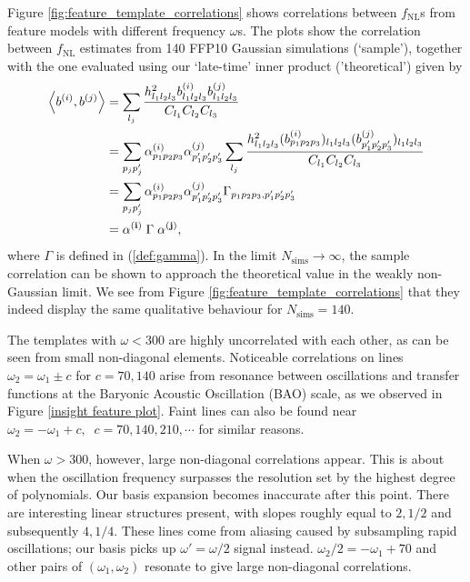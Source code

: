 Figure \ref{fig:feature_template_correlations} shows correlations between $f_\text{NL}$s from feature models with different frequency $\omega$s. The plots show the correlation between $f_\text{NL}$ estimates from 140 FFP10 Gaussian simulations (`sample'), together with the one evaluated using our `late-time' inner product ('theoretical') given by
\begin{align}
	\left< b^{(i)}, b^{(j)} \right> &= \sum_{l_j} \frac{h^2_{l_1 l_2 l_3} b^{(i)}_{l_1 l_2 l_3} b^{(j)}_{l_1 l_2 l_3}}{C_{l_1} C_{l_2} C_{l_3}}  \\
	&= \sum_{p_j p'_j} \alpha^{(i)}_{p_1 p_2 p_3} \alpha^{(j)}_{p'_1 p'_2 p'_3} \sum_{l_j} \frac{h^2_{l_1 l_2 l_3} (b^{(i)}_{p_1 p_2 p_3})_{l_1 l_2 l_3} (b^{(j)}_{p'_1 p'_2 p'_3})_{l_1 l_2 l_3}}{C_{l_1} C_{l_2} C_{l_3}} \\
	&= \sum_{p_j p'_j} \alpha^{(i)}_{p_1 p_2 p_3} \alpha^{(j)}_{p'_1 p'_2 p'_3} \Gamma_{p_1 p_2 p_3, p'_1 p'_2 p'_3} \\
	&= \mathbf{\alpha^{(i)}} \; \Gamma \; \mathbf{\alpha^{(j)}}, \label{eqn:late_time_inner_product}
\end{align}
where $\Gamma$ is defined in (\ref{def:gamma}). In the limit $N_\text{sims} \rightarrow \infty$, the sample correlation can be shown to approach the theoretical value in the weakly non-Gaussian limit. We see from Figure \ref{fig:feature_template_correlations} that they indeed display the same qualitative behaviour for $N_\text{sims}=140$.

The templates with $\omega < 300$ are highly uncorrelated with each other, as can be seen from small non-diagonal elements. Noticeable correlations on lines $\omega_2 = \omega_1 \pm c$ for $c = 70, 140$ arise from resonance between oscillations and transfer functions at the Baryonic Acoustic Oscillation (BAO) scale, as we observed in Figure \ref{insight feature plot}. Faint lines can also be found near $\omega_2 = -\omega_1 + c, \;\; c = 70,140,210,\cdots$ for similar reasons.

When $\omega > 300$, however, large non-diagonal correlations appear. This is about when the oscillation frequency surpasses the resolution set by the highest degree of polynomials. Our basis expansion becomes inaccurate after this point. There are interesting linear structures present, with slopes roughly equal to $2, 1/2$ and subsequently $4, 1/4$. These lines come from aliasing caused by subsampling rapid oscillations; our basis picks up $\omega' = \omega/2$ signal instead. $\omega_2/2 = -\omega_1 + 70$ and other pairs of $(\omega_1, \omega_2)$ resonate to give large non-diagonal correlations.

